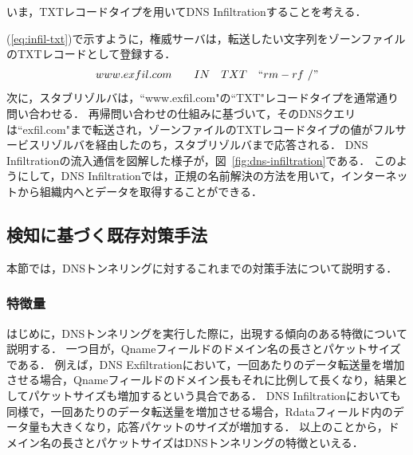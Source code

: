 いま，TXTレコードタイプを用いてDNS Infiltrationすることを考える．

(\ref{eq:infil-txt})で示すように，権威サーバは，転送したい文字列をゾーンファイルのTXTレコードとして登録する．
\begin{eqnarray}
 www.exfil.com \qquad IN \quad TXT \quad ``rm -rf \ /"
 \label{eq:infil-txt}
\end{eqnarray}
次に，スタブリゾルバは，``www.exfil.com"の``TXT"レコードタイプを通常通り問い合わせる．
再帰問い合わせの仕組みに基づいて，そのDNSクエリは``exfil.com"まで転送され，ゾーンファイルのTXTレコードタイプの値がフルサービスリゾルバを経由したのち，スタブリゾルバまで応答される．
DNS Infiltrationの流入通信を図解した様子が，図~\ref{fig:dns-infiltration}である．
このようにして，DNS Infiltrationでは，正規の名前解決の方法を用いて，インターネットから組織内へとデータを取得することができる．


\subsection{検知に基づく既存対策手法}
本節では，DNSトンネリングに対するこれまでの対策手法について説明する．
\subsubsection{特徴量}
\label{sec:pre-tunnel-feature}
はじめに，DNSトンネリングを実行した際に，出現する傾向のある特徴について説明する．
一つ目が，Qnameフィールドのドメイン名の長さとパケットサイズである．
例えば，DNS Exfiltrationにおいて，一回あたりのデータ転送量を増加させる場合，Qnameフィールドのドメイン長もそれに比例して長くなり，結果としてパケットサイズも増加するという具合である．
DNS Infiltrationにおいても同様で，一回あたりのデータ転送量を増加させる場合，Rdataフィールド内のデータ量も大きくなり，応答パケットのサイズが増加する．
以上のことから，ドメイン名の長さとパケットサイズはDNSトンネリングの特徴といえる．



